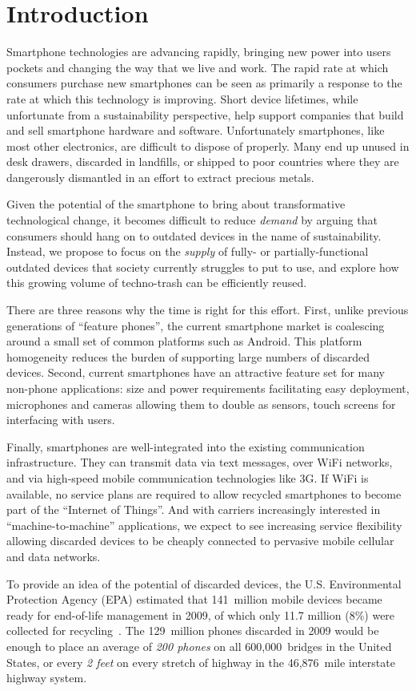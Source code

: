 \section{Introduction}

Smartphone technologies are advancing rapidly, bringing new power into users
pockets and changing the way that we live and work. The rapid rate at which
consumers purchase new smartphones can be seen as primarily a response to the
rate at which this technology is improving. Short device lifetimes, while
unfortunate from a sustainability perspective, help support companies that
build and sell smartphone hardware and software. Unfortunately smartphones,
like most other electronics, are difficult to dispose of properly. Many end
up unused in desk drawers, discarded in landfills, or shipped to poor
countries where they are dangerously dismantled in an effort to extract
precious metals.

Given the potential of the smartphone to bring about transformative
technological change, it becomes difficult to reduce \textit{demand} by
arguing that consumers should hang on to outdated devices in the name of
sustainability. Instead, we propose to focus on the \textit{supply} of fully-
or partially-functional outdated devices that society currently struggles to
put to use, and explore how this growing volume of techno-trash can be
efficiently reused.

There are three reasons why the time is right for this effort. First, unlike
previous generations of ``feature phones'', the current smartphone market is
coalescing around a small set of common platforms such as Android. This
platform homogeneity reduces the burden of supporting large numbers of
discarded devices. Second, current smartphones have an attractive feature set
for many non-phone applications: size and power requirements facilitating
easy deployment, microphones and cameras allowing them to double as sensors,
touch screens for interfacing with users.

Finally, smartphones are well-integrated into the existing communication
infrastructure. They can transmit data via text messages, over WiFi networks,
and via high-speed mobile communication technologies like 3G. If WiFi is
available, no service plans are required to allow recycled smartphones to
become part of the ``Internet of Things''. And with carriers increasingly
interested in ``machine-to-machine'' applications, we expect to see
increasing service flexibility allowing discarded devices to be cheaply
connected to pervasive mobile cellular and data networks.

To provide an idea of the potential of discarded devices, the U.S.
Environmental Protection Agency (EPA) estimated that 141~million mobile
devices became ready for end-of-life management in 2009, of which only 11.7
million (8\%) were collected for recycling~\cite{epa-ewasteweb}. The
129~million phones discarded in 2009 would be enough to place an average of
\textit{200 phones} on all 600,000~bridges in the United States, or every
\textit{2 feet} on every stretch of highway in the 46,876~mile interstate
highway system.
